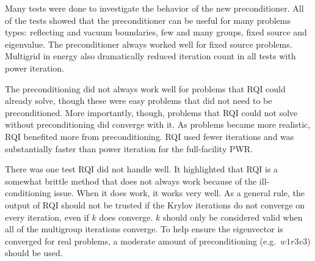 Many tests were done to investigate the behavior of the new preconditioner. All of the tests showed that the preconditioner can be useful for many problems types: reflecting and vacuum boundaries, few and many groups, fixed source and eigenvalue. The preconditioner always worked well for fixed source problems. Multigrid in energy also dramatically reduced iteration count in all tests with power iteration. 

The preconditioning did not always work well for problems that RQI could already solve, though these were easy problems that did not need to be preconditioned. More importantly, though, problems that RQI could not solve without preconditioning did converge with it. As problems became more realistic, RQI benefited more from preconditioning. RQI used fewer iterations and was substantially faster than power iteration for the full-facility PWR.

There was one test RQI did not handle well. It highlighted that RQI is a somewhat brittle method that does not always work because of the ill-conditioning issue. When it does work, it works very well. As a general rule, the output of RQI should not be trusted if the Krylov iterations do not converge on every iteration, even if $k$ does converge. $k$ should only be considered valid when all of the multigroup iterations converge. To help ensure the eigenvector is converged for real problems, a moderate amount of preconditioning (e.g.\ $w1r3v3$) should be used. 




